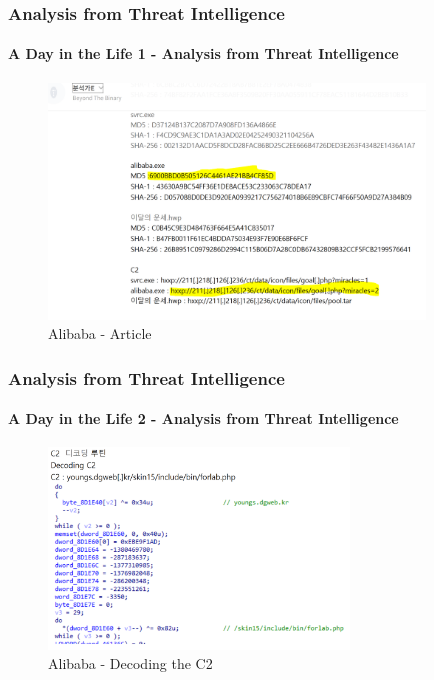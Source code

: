 \documentclass[aspectratio=169]{beamer}
\begin{document}
\begin{frame}
  \frametitle{Analysis from Threat Intelligence}
  \framesubtitle{A Day in the Life 1 - Analysis from Threat Intelligence}
  \begin{center}
    \begin{figure}
    \includegraphics[width=10cm,keepaspectratio]{alibaba_article_0}
    \caption{Alibaba - Article}
    \end{figure}
  \end{center}
\end{frame}

\begin{frame}
  \frametitle{Analysis from Threat Intelligence}
  \framesubtitle{A Day in the Life 2 - Analysis from Threat Intelligence}
  \begin{center}
    \begin{figure}
    \includegraphics[width=8cm,keepaspectratio]{alibaba_article_1}
    \caption{Alibaba - Decoding the C2}
    \end{figure}
  \end{center}
\end{frame}
\end{document}
